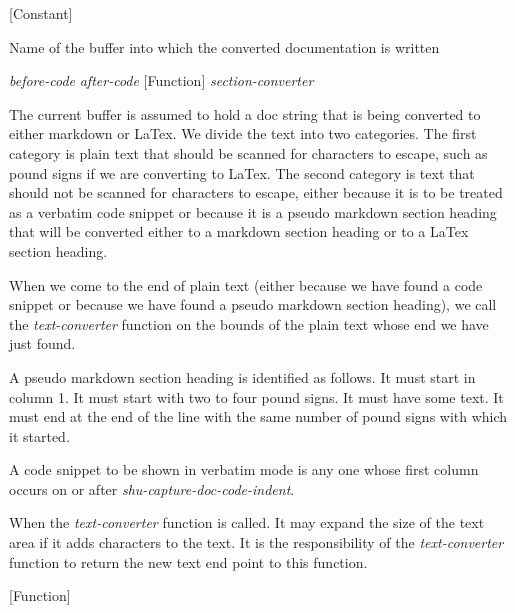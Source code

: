 \vspace{1em}
\noindent
{}
\usebox{\funcname}
 \hfill [Constant]

\begin{doc-string}
Name of the buffer into which the converted documentation is written
\end{doc-string}

\vspace{1em}
\noindent
{}
\usebox{\funcname}\emph{before-code} \emph{after-code}
 \hfill [Function]
\hspace*{\wd\funcname}\emph{section-converter}

\begin{doc-string}
The current buffer is assumed to hold a doc string that is being converted to
either markdown or LaTex.  We divide the text into two categories.  The first
category is plain text that should be scanned for characters to escape, such as
pound signs if we are converting to LaTex.  The second category is text that
should not be scanned for characters to escape, either because it is to be
treated as a verbatim code snippet or because it is a pseudo markdown section
heading that will be converted either to a markdown section heading or to a LaTex
section heading.

When we come to the end of plain text (either because we have found a code
snippet or because we have found a pseudo markdown section heading), we call the
\emph{text-converter} function on the bounds of the plain text whose end we have just
found.

A pseudo markdown section heading is identified as follows.  It must start in
column 1.  It must start with two to four pound signs.  It must have some text.
It must end at the end of the line with the same number of pound signs with which
it started.

A code snippet to be shown in verbatim mode is any one whose first column occurs
on or after \emph{shu-capture-doc-code-indent}.

When the \emph{text-converter} function is called.  It may expand the size of the text
area if it adds characters to the text.  It is the responsibility of the
\emph{text-converter} function to return the new text end point to this function.
\end{doc-string}

\vspace{1em}
\noindent
{}
\usebox{\funcname}
 \hfill [Function]

